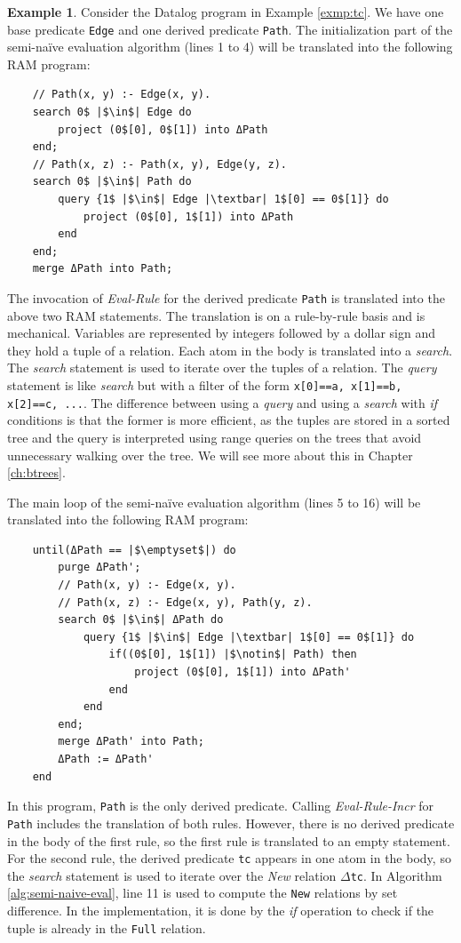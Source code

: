 \documentclass[11pt]{report}
\theoremstyle{definition}
\newtheorem{exmp}{Example}[chapter]
\begin{document}
\begin{exmp}
  Consider the Datalog program in Example \ref{exmp:tc}. We have one base predicate \texttt{Edge} and one derived predicate \texttt{Path}. The initialization part of the semi-naïve evaluation algorithm (lines 1 to 4) will be translated into the following RAM program:
  \begin{verbatim}
    // Path(x, y) :- Edge(x, y).
    search 0$ |$\in$| Edge do
        project (0$[0], 0$[1]) into ΔPath
    end;
    // Path(x, z) :- Path(x, y), Edge(y, z).
    search 0$ |$\in$| Path do
        query {1$ |$\in$| Edge |\textbar| 1$[0] == 0$[1]} do
            project (0$[0], 1$[1]) into ΔPath
        end
    end;
    merge ΔPath into Path;
  \end{verbatim}
  The invocation of \textit{Eval-Rule} for the derived predicate \texttt{Path} is translated into the above two RAM statements. The translation is on a rule-by-rule basis and is mechanical. Variables are represented by integers followed by a dollar sign and they hold a tuple of a relation. Each atom in the body is translated into a \textit{search}. The \textit{search} statement is used to iterate over the tuples of a relation. The \textit{query} statement is like \textit{search} but with a filter of the form \texttt{x[0]==a, x[1]==b, x[2]==c, ...}. The difference between using a \textit{query} and using a \textit{search} with \textit{if} conditions is that the former is more efficient, as the tuples are stored in a sorted tree and the query is interpreted using range queries on the trees that avoid unnecessary walking over the tree. We will see more about this in Chapter \ref{ch:btrees}.

  The main loop of the semi-naïve evaluation algorithm (lines 5 to 16) will be translated into the following RAM program:
  \begin{verbatim}
    until(ΔPath == |$\emptyset$|) do
        purge ΔPath';
        // Path(x, y) :- Edge(x, y).
        // Path(x, z) :- Edge(x, y), Path(y, z).
        search 0$ |$\in$| ΔPath do
            query {1$ |$\in$| Edge |\textbar| 1$[0] == 0$[1]} do
                if((0$[0], 1$[1]) |$\notin$| Path) then
                    project (0$[0], 1$[1]) into ΔPath'
                end
            end
        end;
        merge ΔPath' into Path;
        ΔPath := ΔPath'
    end
  \end{verbatim}

  In this program, \texttt{Path} is the only derived predicate. Calling \textit{Eval-Rule-Incr} for \texttt{Path} includes the translation of both rules. However, there is no derived predicate in the body of the first rule, so the first rule is translated to an empty statement. For the second rule, the derived predicate \texttt{tc} appears in one atom in the body, so the \textit{search} statement is used to iterate over the \textit{New} relation $\Delta$\texttt{tc}. In Algorithm \ref{alg:semi-naive-eval}, line 11 is used to compute the \texttt{New} relations by set difference. In the implementation, it is done by the \textit{if} operation to check if the tuple is already in the \texttt{Full} relation.
\end{exmp}
\label{exmp:tc-ram}
\end{document}
